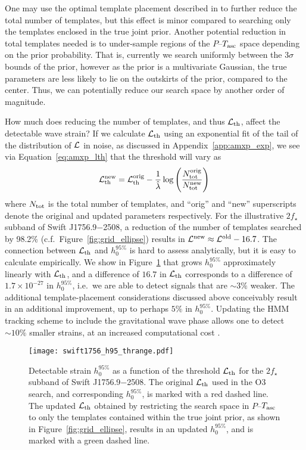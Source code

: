One may use the optimal template placement described in \citet{Wagner2022} to further reduce the total number of templates, but this effect is minor compared to searching only the templates enclosed in the true joint prior. Another potential reduction in total templates needed is to under-sample regions of the $P$--$T_{\textrm{asc}}$ space depending on the prior probability. That is, currently we search uniformly between the $3\sigma$ bounds of the prior, however as the prior is a multivariate Gaussian, the true parameters are less likely to lie on the outskirts of the prior, compared to the center. Thus, we can potentially reduce our search space by another order of magnitude. 

How much does reducing the number of templates, and thus $\mathcal{L}_{\rm th}$, affect the detectable wave strain? If we calculate $\mathcal{L}_{\rm th}$ using an exponential fit of the tail of the distribution of $\mathcal{L}$ in noise, as discussed in Appendix~\ref{app:amxp_exp}, we see via Equation~\eqref{eq:amxp_lth} that the threshold will vary as
\begin{equation}
    \mathcal{L}_{\rm th}^{\rm new} = \mathcal{L}_{\rm th}^{\rm orig} - \frac{1}{\hat{\lambda}} \log \left(\frac{N_{\rm tot}^{\rm orig}}{N_{\rm tot}^{\rm new}}\right)\,
\end{equation}
where $N_{\rm tot}$ is the total number of templates, and ``orig'' and ``new'' superscripts denote the original and updated parameters respectively. For the illustrative $2f_\star$ subband of Swift J1756.9$-$2508, a reduction of the number of templates searched by 98.2\% (c.f.~Figure~\ref{fig:grid_ellipse}) results in $\mathcal{L}^{\rm new} \approx \mathcal{L}^{\rm old} - 16.7$. The connection between $\mathcal{L}_{\rm th}$ and $h_0^{95\%}$ is hard to assess analytically, but it is easy to calculate empirically. We show in Figure~\ref{fig:lth_range} that grows $h_0^{95\%}$ approximately linearly with $\mathcal{L}_{\rm th}$, and a difference of $16.7$ in $\mathcal{L}_{\rm th}$ corresponds to a difference of $1.7\times10^{-27}$ in $h_0^{95\%}$, i.e.~we are able to detect signals that are $\sim3\%$ weaker. The additional template-placement considerations discussed above conceivably result in an additional improvement, up to perhaps $5\%$ in $h_0^{95\%}$. Updating the HMM tracking scheme to include the gravitational wave phase allows one to detect $\sim10\%$ smaller strains, at an increased computational cost \citep{Melatos2021}.

\begin{figure}
    \centering
    \texttt{[image: swift1756\_h95\_thrange.pdf]}
    \caption{Detectable strain $h_0^{95\%}$ as a function of the threshold $\mathcal{L}_{\rm th}$ for the $2f_\star$ subband of Swift J1756.9$-$2508. The original $\mathcal{L}_{\rm th}$ used in the O3 search, and corresponding $h_0^{95\%}$, is marked with a red dashed line. The updated $\mathcal{L}_{\rm th}$ obtained by restricting the search space in $P$--$T_{\textrm{asc}}$ to only the templates contained within the true joint prior, as shown in Figure~\ref{fig:grid_ellipse}, results in an updated $h_0^{95\%}$, and is marked with a green dashed line.}
    \label{fig:lth_range}
\end{figure}

